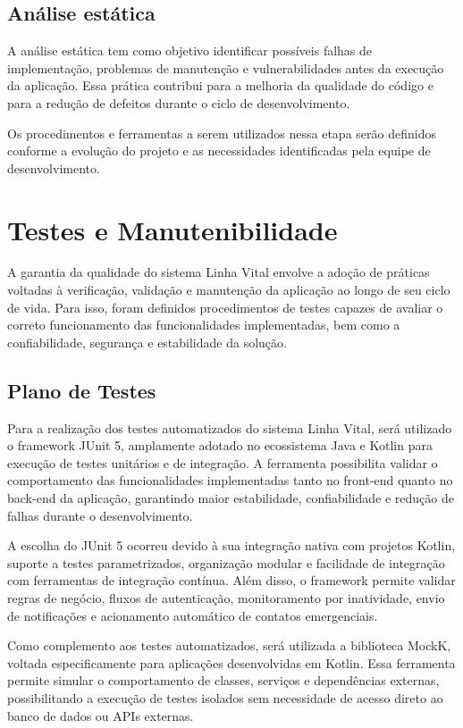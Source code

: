 \subsection{Análise estática}

A análise estática tem como objetivo identificar possíveis falhas de implementação, problemas de manutenção e vulnerabilidades antes da execução da aplicação. Essa prática contribui para a melhoria da qualidade do código e para a redução de defeitos durante o ciclo de desenvolvimento.

Os procedimentos e ferramentas a serem utilizados nessa etapa serão definidos conforme a evolução do projeto e as necessidades identificadas pela equipe de desenvolvimento.

\section{Testes e Manutenibilidade}

A garantia da qualidade do sistema Linha Vital envolve a adoção de práticas voltadas à verificação, validação e manutenção da aplicação ao longo de seu ciclo de vida. Para isso, foram definidos procedimentos de testes capazes de avaliar o correto funcionamento das funcionalidades implementadas, bem como a confiabilidade, segurança e estabilidade da solução.

\subsection{Plano de Testes}

Para a realização dos testes automatizados do sistema Linha Vital, será utilizado o framework JUnit 5, amplamente adotado no ecossistema Java e Kotlin para execução de testes unitários e de integração. A ferramenta possibilita validar o comportamento das funcionalidades implementadas tanto no front-end quanto no back-end da aplicação, garantindo maior estabilidade, confiabilidade e redução de falhas durante o desenvolvimento.

A escolha do JUnit 5 ocorreu devido à sua integração nativa com projetos Kotlin, suporte a testes parametrizados, organização modular e facilidade de integração com ferramentas de integração contínua. Além disso, o framework permite validar regras de negócio, fluxos de autenticação, monitoramento por inatividade, envio de notificações e acionamento automático de contatos emergenciais.

Como complemento aos testes automatizados, será utilizada a biblioteca MockK, voltada especificamente para aplicações desenvolvidas em Kotlin. Essa ferramenta permite simular o comportamento de classes, serviços e dependências externas, possibilitando a execução de testes isolados sem necessidade de acesso direto ao banco de dados ou APIs externas.

